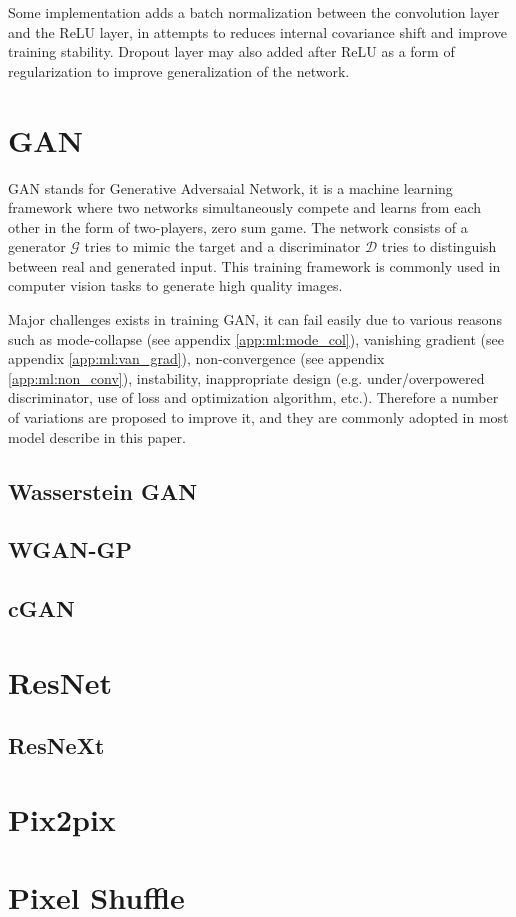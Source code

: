 Some implementation adds a batch normalization between the convolution layer and the ReLU layer, in attempts to reduces internal covariance shift and improve training stability. Dropout layer may also added after ReLU as a form of regularization to improve generalization of the network.

\section{GAN}

GAN stands for Generative Adversaial Network\cite{goodfellowGenerativeAdversarialNetworks2014a}, it is a machine learning framework where two networks simultaneously compete and learns from each other in the form of two-players, zero sum game. The network consists of a generator $\mathcal{G}$ tries to mimic the target and a discriminator $\mathcal{D}$ tries to distinguish between real and generated input. This training framework is commonly used in computer vision tasks to generate high quality images.

Major challenges exists in training GAN, it can fail easily due to various reasons such as mode-collapse (see appendix \ref{app:ml:mode_col}), vanishing gradient (see appendix \ref{app:ml:van_grad}), non-convergence (see appendix \ref{app:ml:non_conv}), instability, inappropriate design (e.g. under/overpowered discriminator, use of loss and optimization algorithm, etc.). Therefore a number of variations are proposed to improve it, and they are commonly adopted in most model describe in this paper.


\subsection{Wasserstein GAN}

\subsection{WGAN-GP}

\subsection{cGAN}

\section{ResNet}

\subsection{ResNeXt}

\section{Pix2pix}

\section{Pixel Shuffle}
